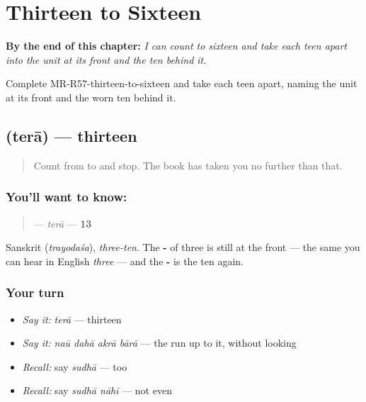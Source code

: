 
\chapter{Thirteen to Sixteen}
\label{ch:mr-thirteen-to-sixteen}

\begin{chapteropening}
\textbf{By the end of this chapter:} \emph{I can count to sixteen and take each teen apart into the unit at its front and the ten behind it.}

Complete MR-R57-thirteen-to-sixteen and take each teen apart, naming the unit at its front and the worn ten behind it.
\end{chapteropening}

\section[\texorpdfstring{\mr{तेरा} (terā)}{तेरा (terā)}]{ (terā) — thirteen}

\label{lesson:MR-C57-tera}



\begin{quote}
Count from \textbf{} to \textbf{} and stop. The book has taken you no further than that.
\end{quote}

\subsection*{You'll want to know: }
\begin{quote}
\textbf{} — \emph{terā} — \textbf{13}
\end{quote}

Sanskrit \textbf{} (\emph{trayodaśa}), \emph{three-ten}. The \textbf{-} of three is still at the front — the same \textbf{} you can hear in English \emph{three} — and the \textbf{-} is the ten again.

\subsection*{Your turn}
\begin{itemize}
\raggedright
  \item \emph{Say it:} \emph{terā} — thirteen
  \item \emph{Say it:} \emph{naū dahā akrā bārā} — the run up to it, without looking
  \item \emph{Recall:} say \emph{sudhā} — too
  \item \emph{Recall:} say \emph{sudhā nāhī} — not even
\end{itemize}

